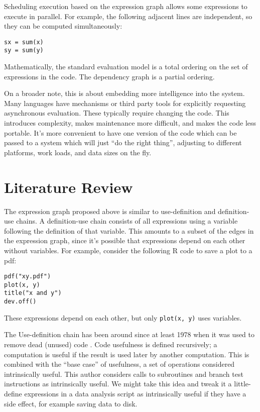 \documentclass[12pt]{article}
\begin{document}
Scheduling execution based on the expression graph allows some expressions to execute in
parallel. For example, the following adjacent lines are independent, so
they can be computed simultaneously:

\begin{verbatim}
sx = sum(x)
sy = sum(y)
\end{verbatim}

Mathematically, the standard evaluation model is a total ordering on the
set of expressions in the code. The dependency graph is a partial ordering.

On a broader note, this is about embedding more intelligence into the 
system. Many languages have mechanisms or third party tools for explicitly
requesting asynchronous evaluation. These typically require changing the
code. This introduces complexity, makes maintenance more difficult, and
makes the code less portable.  It's more convenient to have one version of
the code which can be passed to a system which will just ``do the right
thing'', adjusting to different platforms, work loads, and data sizes on
the fly. 

\section{Literature Review}

The expression graph proposed above is similar to 
use-definition and definition-use chains. A definition-use chain consists
of all expressions using a variable following the definition of that
variable. This amounts to a subset of the edges in the expression graph,
since it's possible that expressions depend on each other without
variables. For example, consider the following R code to save a plot to a
pdf:
\begin{verbatim}
pdf("xy.pdf")
plot(x, y)
title("x and y")
dev.off()
\end{verbatim}
These expressions depend on each other, but only \texttt{plot(x, y)} uses variables.

The Use-definition chain has been around since at least 1978
when it was used to remove dead (unused) code \cite{kennedy1978use}.
Code usefulness is defined recursively; a computation is useful if the result is
used later by another computation. This is combined with the ``base case''
of usefulness, a set of operations considered
intrinsically useful. This author considers calls to subroutines and branch
test instructions as intrinsically useful. We might take this idea and
tweak it a little- define expressions in a data analysis script as
intrinsically useful if they have a side effect, for example
saving data to disk.
\end{document}
